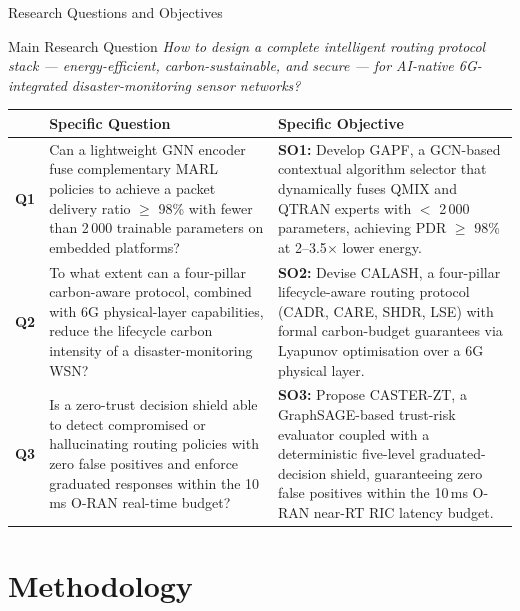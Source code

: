 \documentclass[10pt,aspectratio=169]{beamer}
\begin{document}
\begin{frame}[shrink=8]{Research Questions and Objectives}
\begin{block}{Main Research Question}
  \emph{How to design a complete intelligent routing protocol stack --- energy-efficient, carbon-sustainable, and secure --- for AI-native 6G-integrated disaster-monitoring sensor networks?}
\end{block}

\vspace{4pt}
\footnotesize
\renewcommand{\arraystretch}{1.35}
\begin{tabular}{@{}p{}p{}p{}@{}}
  \toprule
  & \textbf{Specific Question} & \textbf{Specific Objective} \\
  \midrule
  \textbf{Q1} &
    Can a lightweight GNN encoder fuse complementary MARL policies to achieve a packet delivery ratio $\geq$ 98\% with fewer than 2\,000 trainable parameters on embedded platforms? &
    \textbf{SO1:} Develop GAPF, a GCN-based contextual algorithm selector that dynamically fuses QMIX and QTRAN experts with $<$ 2\,000 parameters, achieving PDR $\geq$ 98\% at 2--3.5$\times$ lower energy. \\
  \textbf{Q2} &
    To what extent can a four-pillar carbon-aware protocol, combined with 6G physical-layer capabilities, reduce the lifecycle carbon intensity of a disaster-monitoring WSN? &
    \textbf{SO2:} Devise CALASH, a four-pillar lifecycle-aware routing protocol (CADR, CARE, SHDR, LSE) with formal carbon-budget guarantees via Lyapunov optimisation over a 6G physical layer. \\
  \textbf{Q3} &
    Is a zero-trust decision shield able to detect compromised or hallucinating routing policies with zero false positives and enforce graduated responses within the 10\,ms O-RAN real-time budget? &
    \textbf{SO3:} Propose CASTER-ZT, a GraphSAGE-based trust-risk evaluator coupled with a deterministic five-level graduated-decision shield, guaranteeing zero false positives within the 10\,ms O-RAN near-RT RIC latency budget. \\
  \bottomrule
\end{tabular}
\end{frame}

\section{Methodology}
\end{document}
